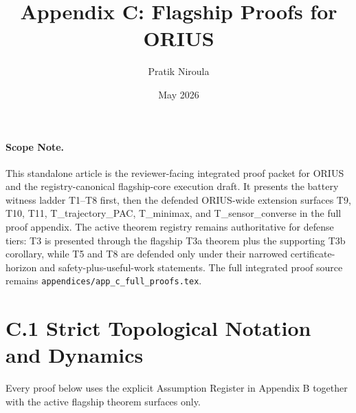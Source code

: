 \documentclass[11pt]{article}
\title{Appendix C: Flagship Proofs for ORIUS}
\author{Pratik Niroula}
\date{May 2026}
\newcommand{\1}{\mathbf{1}}
\begin{document}
\maketitle

\paragraph{Scope Note.}
This standalone article is the reviewer-facing integrated proof packet for
ORIUS and the registry-canonical flagship-core execution draft. It presents the
battery witness ladder T1--T8 first, then the defended ORIUS-wide extension
surfaces T9, T10, T11, T\_trajectory\_PAC, T\_minimax, and
T\_sensor\_converse in the full proof appendix.  The active theorem registry
remains authoritative for defense tiers: T3 is presented through the flagship
T3a theorem plus the supporting T3b corollary, while T5 and T8 are defended only
under their narrowed certificate-horizon and safety-plus-useful-work statements.
The full integrated proof source remains
\texttt{appendices/app\_c\_full\_proofs.tex}.

\section*{C.1 Strict Topological Notation and Dynamics}
Every proof below uses the explicit Assumption Register in Appendix B together
with the active flagship theorem surfaces only.
\end{document}
